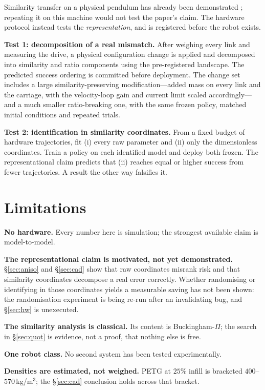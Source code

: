 \documentclass[conference]{IEEEtran}
\begin{document}
Similarity transfer on a physical pendulum has already been demonstrated
\cite{pascoa2025}; repeating it on this machine would not test the paper's
claim. The hardware protocol instead tests the \emph{representation}, and is
registered before the robot exists.

\textbf{Test 1: decomposition of a real mismatch.} After weighing every link and
measuring the drive, a physical configuration change is applied and decomposed
into similarity and ratio components using the pre-registered landscape. The
predicted success ordering is committed before deployment. The change set
includes a large similarity-preserving modification---added mass on every link
and the carriage, with the velocity-loop gain and current limit scaled
accordingly---and a much smaller ratio-breaking one, with the same frozen
policy, matched initial conditions and repeated trials.

\textbf{Test 2: identification in similarity coordinates.} From a fixed budget
of hardware trajectories, fit (i) every raw parameter and (ii) only the
dimensionless coordinates. Train a policy on each identified model and deploy
both frozen. The representational claim predicts that (ii) reaches equal or
higher success from fewer trajectories. A result the other way falsifies it.

\section{Limitations}

\textbf{No hardware.} Every number here is simulation; the strongest available
claim is model-to-model.

\textbf{The representational claim is motivated, not yet demonstrated.}
\S\ref{sec:aniso} and \S\ref{sec:cad} show that raw coordinates misrank risk
and that similarity coordinates decompose a real error correctly. Whether
randomising or identifying in those coordinates yields a measurable saving has
not been shown: the randomisation experiment is being re-run after an
invalidating bug, and \S\ref{sec:hw} is unexecuted.

\textbf{The similarity analysis is classical.} Its content is Buckingham-$\Pi$;
the search in \S\ref{sec:quot} is evidence, not a proof, that nothing else is
free.

\textbf{One robot class.} No second system has been tested experimentally.

\textbf{Densities are estimated, not weighed.} PETG at $25\%$ infill is
bracketed $400$--$570\,$kg/m$^3$; the \S\ref{sec:cad} conclusion holds across
that bracket.
\end{document}
